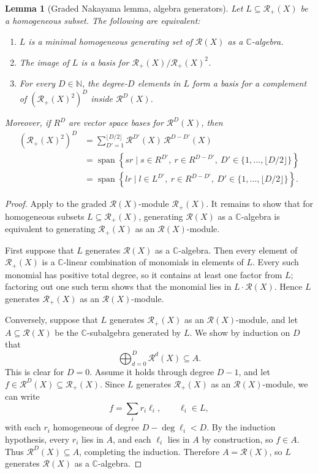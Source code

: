 \documentclass[11pt]{article}
\newcommand{\dsC}{\mathbb{C}}
\newcommand{\dsN}{\mathbb{N}}
\newcommand{\scR}{\mathcal{R}}
\newcommand{\Span}{\operatorname{span}}
\newcommand{\set}[1]{\{#1\}}
\newtheorem{lemma}[theorem]{Lemma}
\theoremstyle{definition}
\begin{document}
\begin{lemma}[Graded Nakayama lemma, algebra generators]\label{lem:algebra-generators}
  Let $L\subseteq \scR_{+}(X)$ be a homogeneous subset. The following are equivalent:
  \begin{enumerate}[label=\textup{(\roman*)}, leftmargin=2em]
    \item $L$ is a minimal homogeneous generating set of $\scR(X)$ as a $\dsC$-algebra.
    \item The image of $L$ is a basis for $\scR_{+}(X)\big/\scR_{+}(X)^2$.
    \item For every $D\in\dsN$, the degree-$D$ elements in $L$ form a basis for a complement of $\left(\scR_{+}(X)^2\right)^D$ inside $\scR^D(X)$.
  \end{enumerate}
  Moreover, if $R^D$ are vector space bases for $\scR^D(X)$, then
  \[
    \begin{aligned}
      \left(\scR_{+}(X)^2\right)^D
      &=
      \sum_{D'=1}^{\lfloor D/2\rfloor} \scR^{D'}(X)\,\scR^{D-D'}(X) \\
      &=
      \Span\left\{s r \mid s\in R^{D'},\ r\in R^{D-D'},\ D'\in \set{1,\dots,\lfloor D/2\rfloor}\right\} \\
      &=
      \Span\left\{l r \mid l\in L^{D'},\ r\in R^{D-D'},\ D'\in \set{1,\dots,\lfloor D/2\rfloor}\right\}.
    \end{aligned}
  \]
\end{lemma}
\begin{proof}
  Apply \cite[Lemma 10.56.1]{Stacks0EKB} to the graded $\scR(X)$-module $\scR_{+}(X)$. It remains to show that for homogeneous subsets $L\subseteq \scR_{+}(X)$, generating $\scR(X)$ as a $\dsC$-algebra is equivalent to generating $\scR_{+}(X)$ as an $\scR(X)$-module.

  First suppose that $L$ generates $\scR(X)$ as a $\dsC$-algebra. Then every element of $\scR_{+}(X)$ is a $\dsC$-linear combination of monomials in elements of $L$. Every such monomial has positive total degree, so it contains at least one factor from $L$; factoring out one such term shows that the monomial lies in $L \cdot \scR(X)$. Hence $L$ generates $\scR_{+}(X)$ as an $\scR(X)$-module.

  Conversely, suppose that $L$ generates $\scR_{+}(X)$ as an $\scR(X)$-module, and let $A\subseteq \scR(X)$ be the $\dsC$-subalgebra generated by $L$. We show by induction on $D$ that
  \[
    \bigoplus_{d=0}^{D} \scR^d(X)\subseteq A.
  \]
  This is clear for $D=0$. Assume it holds through degree $D-1$, and let $f\in \scR^D(X)\subseteq \scR_{+}(X)$. Since $L$ generates $\scR_{+}(X)$ as an $\scR(X)$-module, we can write
  \[
    f=\sum_i r_i\ell_i,
    \qquad
    \ell_i\in L,
  \]
  with each $r_i$ homogeneous of degree $D-\deg \ell_i < D$. By the induction hypothesis, every $r_i$ lies in $A$, and each $\ell_i$ lies in $A$ by construction, so $f\in A$. Thus $\scR^D(X)\subseteq A$, completing the induction. Therefore $A=\scR(X)$, so $L$ generates $\scR(X)$ as a $\dsC$-algebra.
\end{proof}
\end{document}
